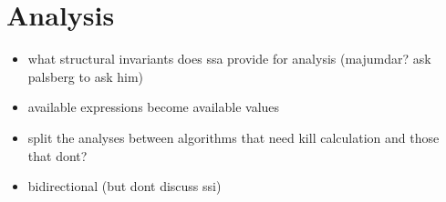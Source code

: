 \part{Analysis}
\label{part:analysis}

\begin{itemize}
 \item what structural invariants does ssa provide for analysis (majumdar? ask palsberg to ask him)
 \item available expressions become available values
 \item split the analyses between algorithms that need kill calculation and those that dont?
 \item bidirectional (but dont discuss ssi)
\end{itemize}



